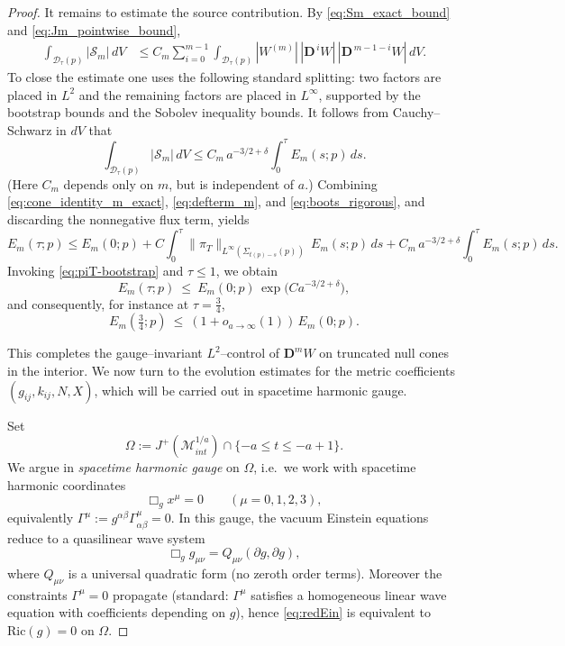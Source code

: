 \documentclass{amsart}
\begin{document}
{\begin{proof}
\noindent
It remains to estimate the source contribution.  By \eqref{eq:Sm_exact_bound} and \eqref{eq:Jm_pointwise_bound},
\begin{align}
\label{eq:Sm_integrated_1}
\int_{\mathcal D_\tau(p)}|\mathcal S_m|\,dV
&\le C_m\sum_{i=0}^{m-1}\int_{\mathcal D_\tau(p)} |W^{(m)}|\,|\mathbf D^{\,i}W|\,|\mathbf D^{\,m-1-i}W|\,dV.
\end{align}
To close the estimate one uses the following standard splitting: two factors are placed in $L^{2}$ and the
remaining factors are placed in $L^{\infty}$, supported by the bootstrap bounds and the Sobolev inequality
bounds.  It follows from Cauchy--Schwarz in $dV$ that
\begin{equation}
\label{eq:boots_rigorous}
\int_{\mathcal D_\tau(p)}|\mathcal S_m|\,dV
\le
C_m\,a^{-3/2+\delta}\int_{0}^{\tau}E_m(s;p)\,ds.
\end{equation}
(Here $C_m$ depends only on $m$, but is independent of $a$.)
Combining \eqref{eq:cone_identity_m_exact}, \eqref{eq:defterm_m}, and \eqref{eq:boots_rigorous}, and discarding the
nonnegative flux term, yields
\begin{equation}
\label{eq:Em_ineq_final}
E_m(\tau;p)
\le
E_m(0;p)
+
C\int_0^\tau \|\pi_T\|_{L^\infty(\Sigma_{t(p)-s}(p))}\,E_m(s;p)\,ds
+
C_m\,a^{-3/2+\delta}\int_{0}^{\tau}E_m(s;p)\,ds.
\end{equation}
Invoking \eqref{eq:piT-bootstrap} and $\tau\le 1$, we obtain
\begin{equation}
\label{eq:Em_gronwall}
E_m(\tau;p)\ \le\ E_m(0;p)\,
\exp\!\big(Ca^{-3/2+\delta}\big),
\end{equation}
and consequently, for instance at $\tau=\tfrac34$,
\[
E_m\!\left(\tfrac34;p\right)\ \le\ (1+o_{a\to\infty}(1))\,E_m(0;p).
\]

\medskip

\noindent
This completes the gauge--invariant $L^{2}$--control of $\mathbf D^{m}W$ on truncated null cones in the interior.
We now turn to the evolution estimates for the metric coefficients $(g_{ij},k_{ij},N,X)$, which will be carried
out in spacetime harmonic gauge.

\noindent Set
\[
\Omega:=J^{+}(\mathcal{M}^{1/a}_{int})\cap\{-a\le t\le -a+1\}.
\]
We argue in \emph{spacetime harmonic gauge} on $\Omega$, i.e.\ we work with spacetime harmonic coordinates
\[
\Box_{g}x^\mu=0\qquad(\mu=0,1,2,3),
\]
equivalently $\Gamma^\mu:=g^{\alpha\beta}\Gamma^\mu_{\alpha\beta}=0$. In this gauge, the vacuum Einstein
equations reduce to a quasilinear wave system
\begin{equation}\label{eq:redEin}
\Box_g g_{\mu\nu}=Q_{\mu\nu}(\partial g,\partial g),
\end{equation}
where $Q_{\mu\nu}$ is a universal quadratic form (no zeroth order terms). Moreover the constraints
$\Gamma^\mu=0$ propagate (standard: $\Gamma^\mu$ satisfies a homogeneous linear wave equation with
coefficients depending on $g$), hence \eqref{eq:redEin} is equivalent to $\text{Ric}(g)=0$ on $\Omega$.


\end{proof}}
\end{document}
